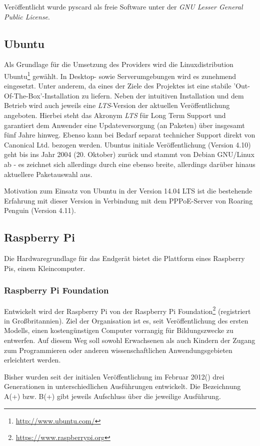 Veröffentlicht wurde pyscard als freie Software unter der
\textit{GNU Lesser General Public License}.

\subsection{Ubuntu}
\label{subsec:ubuntu}
Als Grundlage für die Umsetzung des Providers wird die Linuxdistribution Ubuntu\footnote{\url{http://www.ubuntu.com/}}
gewählt. In Desktop- sowie Serverumgebungen wird es zunehmend eingesetzt.
Unter anderem, da eines der Ziele des Projektes ist eine stabile
'Out-Of-The-Box'-Installation zu liefern. Neben der intuitiven Installation und dem
Betrieb wird auch jeweils eine \textit{LTS}-Version der aktuellen Veröffentlichung angeboten.
Hierbei steht das Akronym \textit{LTS} für Long Term Support und garantiert dem Anwender eine
Updateversorgung (an Paketen) über insgesamt fünf Jahre hinweg. Ebenso kann bei
Bedarf separat technicher Support direkt von Canonical
Ltd. bezogen werden. Ubuntus initiale Veröffentlichung (Version 4.10) geht bis ins Jahr
2004 (20. Oktober) zurück und stammt von Debian GNU/Linux ab - es zeichnet sich
allerdings durch eine ebenso breite, allerdings darüber hinaus aktuellere Paketauswahl aus.

Motivation zum Einsatz von Ubuntu in der Version 14.04 LTS ist die bestehende Erfahrung
mit dieser Version in Verbindung mit dem PPPoE-Server von Roaring Penguin (Version 4.11). 

\subsection{Raspberry Pi}

Die Hardwaregrundlage für das Endgerät bietet die Plattform eines Raspberry Pis, einem Kleincomputer.

\subsubsection{Raspberry Pi Foundation}
Entwickelt wird der Raspberry Pi von der Raspberry Pi Foundation\footnote{\url{https://www.raspberrypi.org}}
(registriert in Großbritannien). Ziel der Organisation ist es,
seit Veröffentlichung des ersten Modells, einen kostengünstigen
Computer vorrangig für Bildungszwecke zu entwerfen. Auf diesem
Weg soll sowohl Erwachsenen als auch Kindern der Zugang zum
Programmieren oder anderen wissenschaftlichen Anwendungsgebieten
erleichtert werden.

Bisher wurden seit der initialen Veröffentlichung im Februar 2012(\cite{rasppifoundweb})
drei Generationen in unterschiedlichen Ausführungen
entwickelt. Die Bezeichnung A(+) bzw. B(+) gibt jeweils Aufschluss
über die jeweilige Ausführung.

